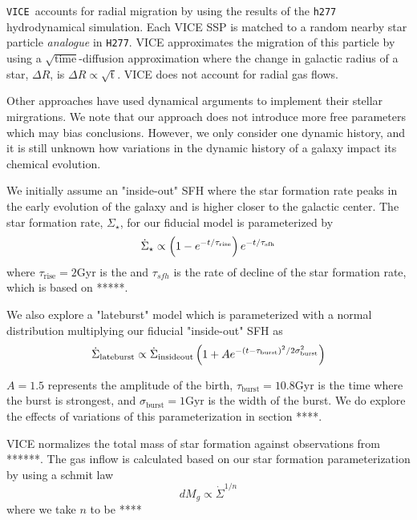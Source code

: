 \documentclass[fleqn,usenatbib]{mnras}
\newcommand{\VICE}{\texttt{VICE}}
\begin{document}
\VICE\ accounts for radial migration by using the results of the \texttt{h277} hydrodynamical simulation. Each VICE SSP is matched to a random nearby star particle \textit{analogue} in \texttt{H277}. VICE approximates the migration of this particle by using a $\sqrt{\text{time}}$-diffusion approximation where the change in galactic radius of a star, $\Delta R$, is $\Delta R \propto \sqrt{\text{t}}$. 
VICE does not account for radial gas flows. 

Other approaches have used dynamical arguments to implement their stellar mirgrations. We note that our approach does not introduce more free parameters which may bias conclusions. However, we only consider one dynamic history, and it is still unknown how variations in the dynamic history of a galaxy impact its chemical evolution.


We initially assume an "inside-out" SFH where the star formation rate peaks in the early evolution of the galaxy and is higher closer to the galactic center. The star formation rate, $\Sigma_\star$, for our fiducial model is parameterized by
\begin{equation}
    \dot{\Sigma}_\star \propto \left(1-e^{-t/\tau_{\rm rise}}\right) e^{-t/\tau_{\rm sfh}}
\end{equation}
where $\tau_\text{rise}=2$Gyr is the
and $\tau_{sfh}$ is the rate of decline of the star formation rate, which is based on *****.

We also explore a "lateburst" model which is parameterized with a normal distribution multiplying our fiducial "inside-out" SFH as
\begin{equation}
    \dot{\Sigma}_{\rm lateburst} \propto \dot{\Sigma}_{\rm insideout} \left(1 + A e^{-(t-\tau_{\rm burst})^2/2\sigma^2_{\rm burst}} \right)
\end{equation}

$A=1.5$ represents the amplitude of the birth, $\tau_\text{burst}=10.8$Gyr is the time where the burst is strongest, and $\sigma_\text{burst}=1$Gyr is the width of the burst. We do explore the effects of variations of this parameterization in section ****.


VICE normalizes the total mass of star formation against observations from ******.
The gas inflow is calculated based on our star formation parameterization by using a schmit law 
\begin{equation}
    dM_g \propto \dot{\Sigma}^{1/n}
\end{equation}
where we take $n$ to be ****
\end{document}
